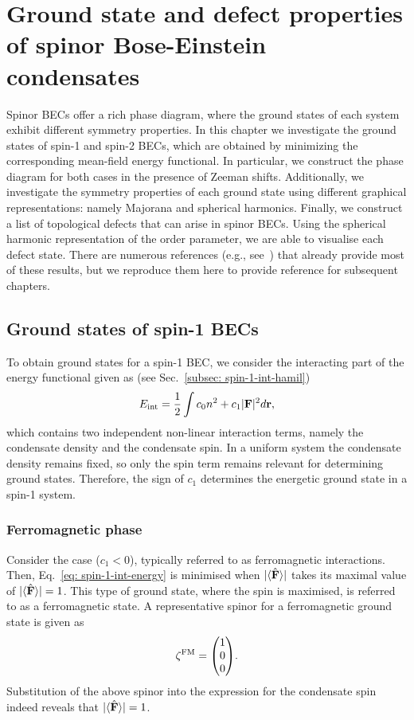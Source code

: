 \chapter[Ground state and defect properties of spinor Bose-Einstein condensates]
[Ground states and defects]{\label{chap: ground-states}
Ground state and defect properties of spinor Bose-Einstein condensates}
Spinor BECs offer a rich phase diagram, where the ground states of each system
exhibit different symmetry properties.
In this chapter we investigate the ground states of spin-1 and spin-2 BECs,
which are obtained by minimizing the corresponding mean-field energy functional.
In particular, we construct the phase diagram for both cases in the presence
of Zeeman shifts.
Additionally, we investigate the symmetry properties of each ground state
using different graphical representations: namely Majorana and spherical
harmonics.
Finally, we construct a list of topological defects that can arise in spinor
BECs.
Using the spherical harmonic representation of the order parameter, we are able
to visualise each defect state.
There are numerous references (e.g., see~\cite{Ciobanu2000, Zhang2003,
Kawaguchi2012,Stamper-Kurn2013}) that already provide most of these results,
but we reproduce them here to provide reference for subsequent chapters.

\section{Ground states of spin-1 BECs}\label{sec: ground-states-spin-1}
To obtain ground states for a spin-1 BEC, we consider the interacting part of
the energy functional given as (see Sec.~\ref{subsec: spin-1-int-hamil})
\begin{align}\label{eq: spin-1-int-energy}
    E_\mathrm{int} = \frac{1}{2}\int c_0n^2+c_1|\vb{F}|^2 d\vb{r},
\end{align}
which contains two independent non-linear interaction terms, namely the
condensate density and the condensate spin.
In a uniform system the condensate density remains fixed, so only the spin term
remains relevant for determining ground states.
Therefore, the sign of \(c_1\) determines the energetic ground state in a
spin-1 system.

\subsection{Ferromagnetic phase}
Consider the case (\(c_1 < 0 \)), typically referred to as ferromagnetic
interactions.
Then, Eq.~\eqref{eq: spin-1-int-energy} is minimised when \(|\langle \hat{\vb{F}} \rangle | \) takes
its maximal value of \(|\langle \hat{\vb{F}} \rangle |=1\).
This type of ground state, where the spin is maximised, is referred to as a
ferromagnetic state.
A representative spinor for a ferromagnetic ground state is given
as~\cite{Kawaguchi2012}
\begin{equation}
    \zeta^\mathrm{FM} = \mqty(1 \\ 0 \\ 0).
\end{equation}
Substitution of the above spinor into the expression for the condensate spin
indeed reveals that \(|\langle \hat{\vb{F}} \rangle |=1\).

